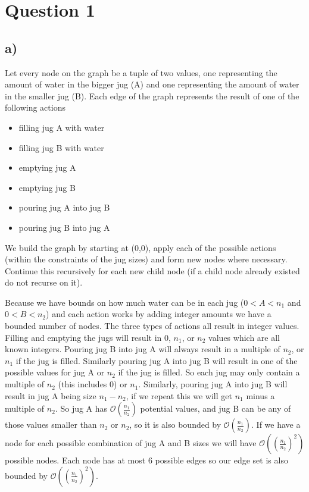 \documentclass[12pt]{article}
\begin{document}

\section*{Question 1}
\subsection*{a)}
Let every node on the graph be a tuple of two values, one representing the amount of water in the bigger jug (A) and one representing the amount of water in the smaller jug (B). Each edge of the graph represents the result of one of the following actions
\begin{itemize}
    \item filling jug A with water
    \item filling jug B with water
    \item emptying jug A
    \item emptying jug B
    \item pouring jug A into jug B
    \item pouring jug B into jug A
\end{itemize}
We build the graph by starting at (0,0), apply each of the possible actions (within the constraints of the jug sizes) and form new nodes where necessary. Continue this recursively for each new child node (if a child node already existed do not recurse on it).

Because we have bounds on how much water can be in each jug ($0 < A < n_1$ and $0 < B < n_2$) and each action works by adding integer amounts we have a bounded number of nodes. The three types of actions all result in integer values. Filling and emptying the jugs will result in 0, $n_1$, or $n_2$ values which are all known integers. Pouring jug B into jug A will always result in a multiple of $n_2$, or $n_1$ if the jug is filled. Similarly pouring jug A into jug B will result in one of the possible values for jug A or $n_2$ if the jug is filled. So each jug may only contain a multiple of $n_2$ (this includes 0) or $n_1$. Similarly, pouring jug A into jug B will result in jug A being size $n_1-n_2$, if we repeat this we will get $n_1$ minus a multiple of $n_2$. So jug A has $\mathcal{O}(\frac{n_1}{n_2})$ potential values, and jug B can be any of those values smaller than $n_2$ or $n_2$, so it is also bounded by $\mathcal{O}(\frac{n_1}{n_2})$. If we have a node for each possible combination of jug A and B sizes we will have $\mathcal{O}((\frac{n_1}{n_2})^2)$ possible nodes. Each node has at most 6 possible edges so our edge set is also bounded by $\mathcal{O}((\frac{n_1}{n_2})^2)$.
\end{document}
